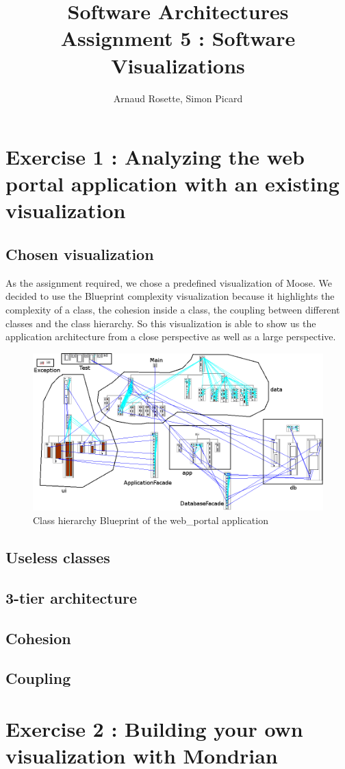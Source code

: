 \documentclass[a4paper,10pt]{article}
\title{Software Architectures\\ Assignment 5 : Software Visualizations}
\author{Arnaud Rosette, Simon Picard}
\begin{document}
\maketitle
\section{Exercise 1 : Analyzing the web portal application with an existing visualization}
\subsection{Chosen visualization}
As the assignment required, we chose a predefined visualization of Moose. We decided to use the Blueprint complexity visualization because it highlights the complexity of a class, the cohesion inside a class, the coupling between different classes and the class hierarchy. So this visualization is able to show us the application architecture from a close perspective as well as a large perspective.
\begin{figure}[H]
\includegraphics[width=\textwidth]{src/blueprint.png}
\centering
\caption{Class hierarchy Blueprint of the web\_portal application}
\end{figure}
\subsection{Useless classes}

\subsection{3-tier architecture}

\subsection{Cohesion}

\subsection{Coupling}

\section{Exercise 2 : Building your own visualization with Mondrian}
\end{document}
